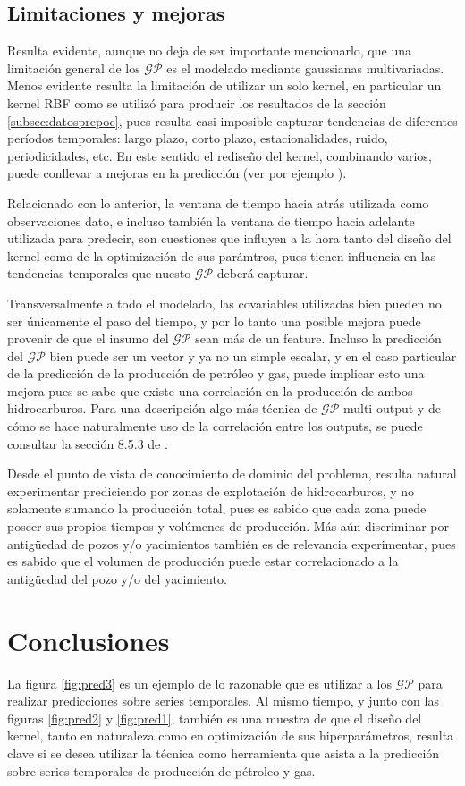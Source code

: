 \documentclass[a4paper]{article}
\newcommand{\gp}{\ensuremath{\mathcal{GP}}}
\begin{document}
\subsection{Limitaciones y mejoras}
Resulta evidente, aunque no deja de ser importante mencionarlo, que una limitación general de los $\gp$ es el modelado mediante gaussianas multivariadas. Menos evidente resulta la limitación de utilizar un solo kernel, en particular un kernel RBF como se utilizó para producir los resultados de la sección \ref{subsec:datosprepoc}, pues resulta casi imposible capturar tendencias de diferentes períodos temporales: largo plazo, corto plazo, estacionalidades, ruido, periodicidades, etc. En este sentido el rediseño del kernel, combinando varios, puede conllevar a mejoras en la predicción (ver por ejemplo \cite{tesisduvenaud}).

Relacionado con lo anterior, la ventana de tiempo hacia atrás utilizada como observaciones dato, e incluso también la ventana de tiempo hacia adelante utilizada para predecir, son cuestiones que influyen a la hora tanto del diseño del kernel como de la optimización de sus parámtros, pues tienen influencia en las tendencias temporales que nuesto $\gp$ deberá capturar.

Transversalmente a todo el modelado, las covariables utilizadas bien pueden no ser únicamente el paso del tiempo, y por lo tanto una posible mejora puede provenir de que el insumo del $\gp$ sean más de un feature. Incluso la predicción del $\gp$ bien puede ser un vector y ya no un simple escalar, y en el caso particular de la predicción de la producción de petróleo y gas, puede implicar esto una mejora pues se sabe que existe una correlación en la producción de ambos hidrocarburos. Para una descripción algo más técnica de $\gp$ multi output y de cómo se hace naturalmente uso de la correlación entre los outputs, se puede consultar la sección 8.5.3 de \cite{tobar}.

Desde el punto de vista de conocimiento de dominio del problema, resulta natural experimentar prediciendo por zonas de explotación de hidrocarburos, y no solamente sumando la producción total, pues es sabido que cada zona puede poseer sus propios tiempos y volúmenes de producción. Más aún discriminar por antigüedad de pozos y/o yacimientos también es de relevancia experimentar, pues es sabido que el volumen de producción puede estar correlacionado a la antigüedad del pozo y/o del yacimiento.



\section{Conclusiones}
La figura \ref{fig:pred3} es un ejemplo de lo razonable que es utilizar a los $\gp$ para realizar predicciones sobre series temporales. Al mismo tiempo, y junto con las figuras \ref{fig:pred2} y \ref{fig:pred1}, también es una muestra de que el diseño del kernel, tanto en naturaleza como en optimización de sus hiperparámetros, resulta clave si se desea utilizar la técnica como herramienta que asista a la predicción sobre series temporales de producción de pétroleo y gas.
\end{document}
